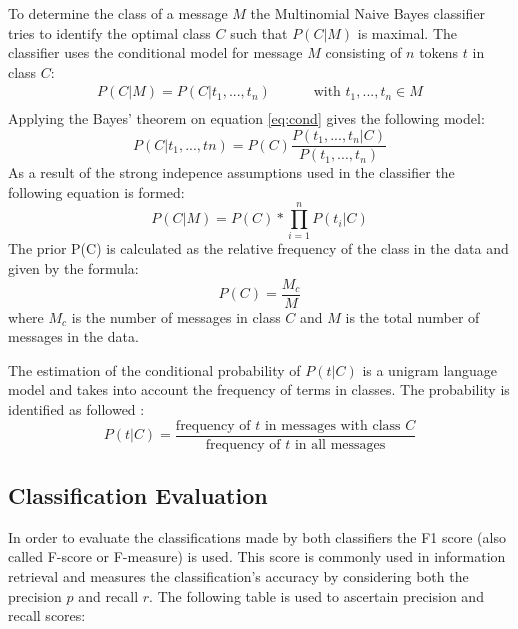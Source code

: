 To determine the class of a message $M$ the Multinomial Naive Bayes classifier tries to identify the optimal class $C$ such that $P(C|M)$ is maximal. The classifier uses the conditional model for message $M$ consisting of $n$ tokens $t$ in class $C$:
\begin{equation}\label{eq:cond}\begin{aligned}
P(C|M) = P(C|t_1, ..., t_n) & & ~~~ & \mbox{with } t_1, ..., t_n \in M \\
\end{aligned} \end{equation}
Applying the Bayes' theorem on equation \ref{eq:cond} gives the following model:
\begin{equation}
P(C|t_1, ..., tn) = P(C) \frac{P(t_1,...,t_n|C)}{P(t_1, ..., t_n)}
\end{equation}
As a result of the strong indepence assumptions used in the classifier the following equation is formed:
\begin{equation}
P(C|M) = P(C) *  \displaystyle\prod\limits_{i=1}^n P(t_i|C)
\end{equation}
The prior P(C) is calculated as the relative frequency of the class in the data and given by the formula:
\begin{equation}
P(C) = \frac{M_c}{M}
\end{equation}
where $M_c$ is the number of messages in class $C$ and $M$ is the total number of messages in the data.

The estimation of the conditional probability of  $P(t|C)$ is a unigram language model and takes into account the frequency of terms in classes. The probability is identified as followed :
\begin{equation}
P(t|C) = \frac{\text{frequency of }  t \text{ in messages with class } C}{ \text{frequency of }  t \text{ in all messages} }
\end{equation}

\subsection{Classification Evaluation}\label{sec:f1}
In order to evaluate the classifications made by both classifiers the F1 score (also called F-score or F-measure) is used. This score is commonly used in information retrieval and measures the classification's accuracy by considering both the precision $p$ and recall $r$. The following table is used to ascertain precision and recall scores:\\

